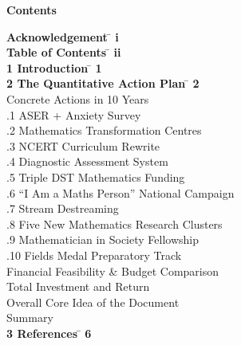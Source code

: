 \documentclass[12pt,a4paper]{article}
\begin{document}
\setcounter{page}{2}

\begin{center}
    {\Large \textbf{Contents}}
\end{center}

\vspace{0.5cm}

\begin{tabbing}
\textbf{Acknowledgement} \=\hspace{11.5cm} \textbf{i} \\
\textbf{Table of Contents} \=\hspace{11.5cm} \textbf{ii} \\[0.3cm]
\textbf{1 \quad Introduction} \=\hspace{11.5cm} \textbf{1} \\[0.3cm]
\textbf{2 \quad The Quantitative Action Plan} \=\hspace{11.5cm} \textbf{2} \\
  Concrete Actions in 10 Years  \\
\> .1 \quad ASER + Anxiety Survey  \\
\> .2  Mathematics Transformation Centres  \\
\> .3 \quad NCERT Curriculum Rewrite  \\
\> .4 \quad Diagnostic Assessment System  \\
\> .5 \quad Triple DST Mathematics Funding  \\
\> .6 \quad “I Am a Maths Person” National Campaign  \\
\> .7 \quad Stream Destreaming  \\
\> .8 \quad Five New Mathematics Research Clusters  \\
\> .9 \quad Mathematician in Society Fellowship  \\
\> .10 \quad Fields Medal Preparatory Track  \\
 \quad Financial Feasibility \& Budget Comparison  \\
 \quad Total Investment and Return  \\
 \quad Overall Core Idea of the Document  \\
 \quad Summary  \\[0.3cm]
\textbf{3 \quad References} \=\hspace{11.5cm} \textbf{6}
\end{tabbing}
\end{document}
